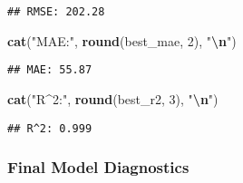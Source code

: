 \documentclass[
]{article}
\newenvironment{Shaded}{\begin{snugshade}}{\end{snugshade}}
\newcommand{\DecValTok}[1]{\textcolor[rgb]{0.00,0.00,0.81}{#1}}
\newcommand{\FunctionTok}[1]{\textcolor[rgb]{0.13,0.29,0.53}{\textbf{#1}}}
\newcommand{\NormalTok}[1]{#1}
\newcommand{\SpecialCharTok}[1]{\textcolor[rgb]{0.81,0.36,0.00}{\textbf{#1}}}
\newcommand{\StringTok}[1]{\textcolor[rgb]{0.31,0.60,0.02}{#1}}
\begin{document}
\begin{verbatim}
## RMSE: 202.28
\end{verbatim}

\begin{Shaded}
\begin{Highlighting}[]
\FunctionTok{cat}\NormalTok{(}\StringTok{"MAE:"}\NormalTok{, }\FunctionTok{round}\NormalTok{(best\_mae, }\DecValTok{2}\NormalTok{), }\StringTok{"}\SpecialCharTok{\textbackslash{}n}\StringTok{"}\NormalTok{)}
\end{Highlighting}
\end{Shaded}

\begin{verbatim}
## MAE: 55.87
\end{verbatim}

\begin{Shaded}
\begin{Highlighting}[]
\FunctionTok{cat}\NormalTok{(}\StringTok{"R\^{}2:"}\NormalTok{, }\FunctionTok{round}\NormalTok{(best\_r2, }\DecValTok{3}\NormalTok{), }\StringTok{"}\SpecialCharTok{\textbackslash{}n}\StringTok{"}\NormalTok{)}
\end{Highlighting}
\end{Shaded}

\begin{verbatim}
## R^2: 0.999
\end{verbatim}

\subsubsection{Final Model Diagnostics}\label{final-model-diagnostics}
\end{document}
